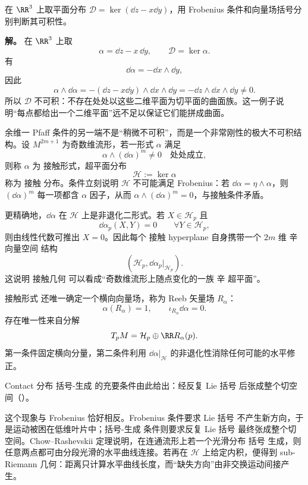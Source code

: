 \begin{exbox}[接触型平面场不可积]
在 $\RR^3$ 上取平面分布 $\mathcal D=\ker(\dd z-x\dd y)$，用 Frobenius 条件和向量场括号分别判断其可积性。

\textbf{解。} 在 $\RR^3$ 上取
\[
\alpha=\dd z-x\,\dd y,
\qquad
\mathcal D=\ker\alpha.
\]
有
\[
\dd\alpha=-\dd x\wedge\dd y,
\]
因此
\[
\alpha\wedge\dd\alpha
=-(\dd z-x\dd y)\wedge\dd x\wedge\dd y
=-\dd z\wedge\dd x\wedge\dd y\neq0.
\]
所以 $\mathcal D$ 不可积：不存在处处以这些二维平面为切平面的曲面族。这一例子说明“每点都给出一个二维平面”远不足以保证它们能拼成曲面。
\end{exbox}

余维一 Pfaff 条件的另一端不是“稍微不可积”，而是一个非常刚性的极大不可积结构。设 $M^{2m+1}$ 为奇数维流形，若一形式 $\alpha$ 满足
\begin{equation}
{
\alpha\wedge(\dd\alpha)^m\neq0
\quad\text{处处成立},
}
\label{eq:math-dg-contact-condition}
\end{equation}
则称 $\alpha$ 为 接触形式，超平面分布
\[
\mathcal H:=\ker\alpha
\]
称为 接触 分布。条件立刻说明 $\mathcal H$ 不可能满足 Frobenius：若 $\dd\alpha=\eta\wedge\alpha$，则 $(\dd\alpha)^m$ 每一项都含 $\alpha$ 因子，从而 $\alpha\wedge(\dd\alpha)^m=0$，与接触条件矛盾。

更精确地，$\dd\alpha$ 在 $\mathcal H$ 上是非退化二形式。若 $X\in\mathcal H_p$ 且
\[
\dd\alpha_p(X,Y)=0
\qquad\forall Y\in\mathcal H_p,
\]
则由线性代数可推出 $X=0$。因此每个 接触 hyperplane 自身携带一个 $2m$ 维 辛 向量空间 结构
\begin{equation*}\left(\mathcal H_p,\dd\alpha_p|_{\mathcal H_p}\right).\end{equation*}
这说明 接触几何 可以看成“奇数维流形上随点变化的一族 辛 超平面”。

接触形式 还唯一确定一个横向向量场，称为 Reeb 矢量场 $R_\alpha$：
\begin{equation*}{
\alpha(R_\alpha)=1,
\qquad
\iota_{R_\alpha}\dd\alpha=0.
}\end{equation*}
存在唯一性来自分解
\[
T_pM=\mathcal H_p\oplus\RR R_\alpha(p).
\]
第一条件固定横向分量，第二条件利用 $\dd\alpha|_{\mathcal H}$ 的非退化性消除任何可能的水平修正。

Contact 分布 括号-生成 的充要条件由此给出：经反复 Lie 括号 后张成整个切空间（）。

这个现象与 Frobenius 恰好相反。Frobenius 条件要求 Lie 括号 不产生新方向，于是运动被困在低维叶片中；括号-生成 条件则要求反复 Lie 括号 最终张成整个切空间。Chow--Rashevskii 定理说明，在连通流形上若一个光滑分布 括号 生成，则任意两点都可由分段光滑的水平曲线连接。若再在 $\mathcal H$ 上给定内积，便得到 sub-Riemann 几何：距离只计算水平曲线长度，而“缺失方向”由非交换运动间接产生。

